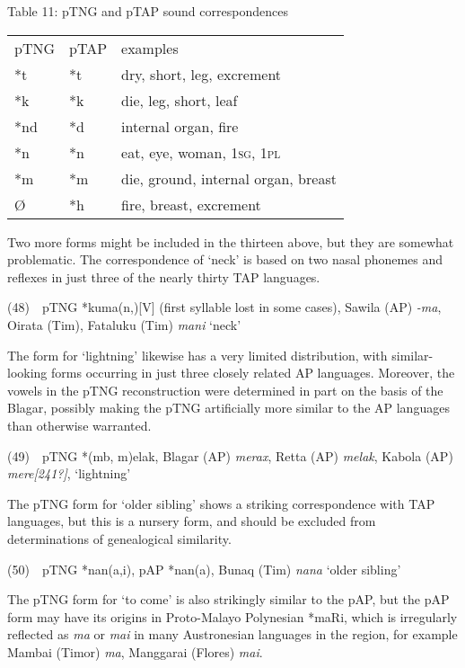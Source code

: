 {\centering
Table 11: pTNG and pTAP sound correspondences
\par}

\begin{center}
\tablehead{}
\begin{supertabular}{m{0.46155986in}m{0.46985987in}m{2.13866in}}
pTNG &
pTAP &
examples\\
*t &
*t &
dry, short, leg, excrement\\
*k &
*k &
die, leg, short, leaf\\
*nd &
*d &
internal organ, fire\\
*n &
*n &
eat, eye, woman, \textsc{1sg, 1pl}\\
*m &
*m &
die, ground, internal organ, breast\\
{\O} &
*h &
fire, breast, excrement\\
\end{supertabular}
\end{center}
Two more forms might be included in the thirteen above, but they are somewhat problematic. The correspondence of {\textquoteleft}neck{\textquoteright} is based on two nasal phonemes and reflexes in just three of the nearly thirty TAP languages. 

(48)\ \ pTNG *kuma(n,{\ng})[V] (first syllable lost in some cases), Sawila (AP) \textit{{}-ma{\ng}}, Oirata (Tim), Fataluku (Tim) \textit{mani} {\textquoteleft}neck{\textquoteright}  

The form for {\textquoteleft}lightning{\textquoteright} likewise has a very limited distribution, with similar-looking forms occurring in just three closely related AP languages. Moreover, the vowels in the pTNG reconstruction were determined in part on the basis of the Blagar, possibly making the pTNG artificially more similar to the AP languages than otherwise warranted.

(49)\ \ pTNG *(mb, m)elak, Blagar (AP) \textit{merax}, Retta (AP) \textit{melak}, Kabola (AP) \textit{mere}\textit{[241?]}, {\textquoteleft}lightning{\textquoteright} 

The pTNG form for {\textquoteleft}older sibling{\textquoteright} shows a striking correspondence with TAP languages, but this is a nursery form, and should be excluded from determinations of genealogical similarity. 

(50)\ \ pTNG *nan(a,i), pAP *nan(a), Bunaq (Tim) \textit{nana} {\textquoteleft}older sibling{\textquoteright}

The pTNG form for {\textquoteleft}to come{\textquoteright} is also strikingly similar to the pAP, but the pAP form may have its origins in Proto-Malayo Polynesian *maRi, which is irregularly reflected as \textit{ma }or \textit{mai }in many Austronesian languages in the region, for example Mambai (Timor) \textit{ma}, Manggarai (Flores) \textit{mai}. 

